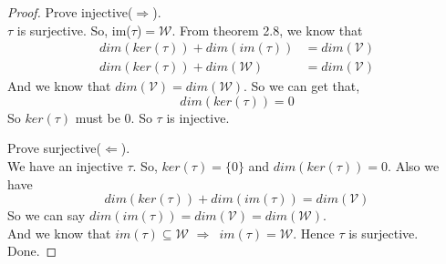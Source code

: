 \documentclass[a4paper]{article}
\begin{document}
\begin{description}
\begin{proof}
Prove injective($\Rightarrow$). \\
$\tau$ is surjective. So, im($\tau$)$=\mathcal{W}$. From theorem 2.8, we know that
\begin{align*}
  dim\left(ker\left(\tau\right)\right)+dim\left(im\left(\tau\right)\right)&=dim\left(\mathcal{V}\right)\\
  dim\left(ker\left(\tau\right)\right)+dim\left(\mathcal{W}\right)&=dim\left(\mathcal{V}\right)
\end{align*}
And we know that $dim(\mathcal{V})=dim(\mathcal{W})$. So we can get that, $$dim\left(ker\left(\tau\right)\right)=0$$
So $ker\left(\tau\right)$ must be $0$. So $\tau$ is injective.


Prove surjective($\Leftarrow$).\\
We have an injective $\tau$. So, $ker\left(\tau\right)=\{0\} $ and $dim\left(ker\left(\tau\right)\right)=0$. Also we have $$dim\left(ker\left(\tau\right)\right)+dim\left(im\left(\tau\right)\right)=dim\left(\mathcal{V}\right)$$
So we can say $dim\left(im\left(\tau\right)\right)=dim\left(\mathcal{V}\right)=dim\left(\mathcal{W}\right)$. \\
And we know that $im\left(\tau\right)\subseteq\mathcal{W}$ $\Rightarrow$\ $im\left(\tau\right)=\mathcal{W}$.
Hence $\tau$ is surjective.\\
Done.
\end{proof}

\end{description}
\end{document}
